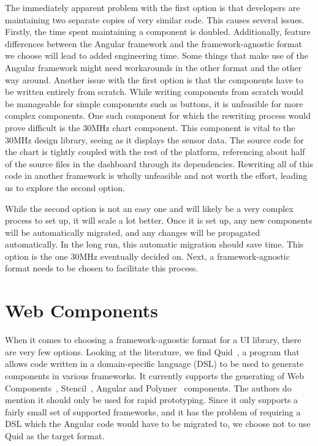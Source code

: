 The immediately apparent problem with the first option is that developers are maintaining two separate copies of very similar code. This causes several issues. Firstly, the time spent maintaining a component is doubled. Additionally, feature differences between the Angular framework and the framework-agnostic format we choose will lead to added engineering time. Some things that make use of the Angular framework might need workarounds in the other format and the other way around. Another issue with the first option is that the components have to be written entirely from scratch. While writing components from scratch would be manageable for simple components such as buttons, it is unfeasible for more complex components. One such component for which the rewriting process would prove difficult is the 30MHz chart component. This component is vital to the 30MHz design library, seeing as it displays the sensor data. The source code for the chart is tightly coupled with the rest of the platform, referencing about half of the source files in the dashboard through its dependencies. Rewriting all of this code in another framework is wholly unfeasible and not worth the effort, leading us to explore the second option.

While the second option is not an easy one and will likely be a very complex process to set up, it will scale a lot better. Once it is set up, any new components will be automatically migrated, and any changes will be propagated automatically. In the long run, this automatic migration should save time. This option is the one 30MHz eventually decided on. Next, a framework-agnostic format needs to be chosen to facilitate this process.

\section{Web Components}\label{sec:bg:webcomponents}
When it comes to choosing a framework-agnostic format for a UI library, there are very few options. Looking at the literature, we find Quid~\cite{molina2019quid}, a program that allows code written in a domain-specific language (DSL) to be used to generate components in various frameworks. It currently supports the generating of Web Components~, Stencil~, Angular and Polymer~ components. The authors do mention it should only be used for rapid prototyping. Since it only supports a fairly small set of supported frameworks, and it has the problem of requiring a DSL which the Angular code would have to be migrated to, we choose not to use Quid as the target format.

